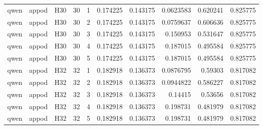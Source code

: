 \begin{longtable}{lllrrrrrrr}
qwen & appod & H30 & 30 & 1 & 0.174225 & 0.143175 & 0.0623583 & 0.620241 & 0.825775 \\
qwen & appod & H30 & 30 & 2 & 0.174225 & 0.143175 & 0.0759637 & 0.606636 & 0.825775 \\
qwen & appod & H30 & 30 & 3 & 0.174225 & 0.143175 & 0.150953 & 0.531647 & 0.825775 \\
qwen & appod & H30 & 30 & 4 & 0.174225 & 0.143175 & 0.187015 & 0.495584 & 0.825775 \\
qwen & appod & H30 & 30 & 5 & 0.174225 & 0.143175 & 0.187015 & 0.495584 & 0.825775 \\
qwen & appod & H32 & 32 & 1 & 0.182918 & 0.136373 & 0.0876795 & 0.59303 & 0.817082 \\
qwen & appod & H32 & 32 & 2 & 0.182918 & 0.136373 & 0.0944822 & 0.586227 & 0.817082 \\
qwen & appod & H32 & 32 & 3 & 0.182918 & 0.136373 & 0.14415 & 0.53656 & 0.817082 \\
qwen & appod & H32 & 32 & 4 & 0.182918 & 0.136373 & 0.198731 & 0.481979 & 0.817082 \\
qwen & appod & H32 & 32 & 5 & 0.182918 & 0.136373 & 0.198731 & 0.481979 & 0.817082 \\
\end{longtable}
